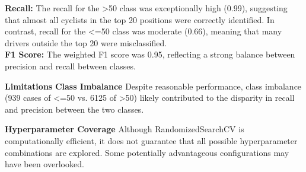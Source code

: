 \documentclass[a4paper, twoside]{article}
\begin{document}
\textbf{Recall:} The recall for the >50 class was exceptionally high (0.99), suggesting that almost all cyclists in the top 20 positions were correctly identified. In contrast, recall for the <=50 class was moderate (0.66), meaning that many drivers outside the top 20 were misclassified. \\

\textbf{F1 Score:} The weighted F1 score was 0.95, reflecting a strong balance between precision and recall between classes. \\

\begin{table}[ht]
\centering
{}
\caption{Confusion Matrix}
\end{table}


\textbf{Limitations}
\textbf{Class Imbalance}
Despite reasonable performance, class imbalance (939 cases of <=50 vs. 6125 of >50) likely contributed to the disparity in recall and precision between the two classes.

\textbf{Hyperparameter Coverage}
Although RandomizedSearchCV is computationally efficient, it does not guarantee that all possible hyperparameter combinations are explored. Some potentially advantageous configurations may have been overlooked.
\end{document}
